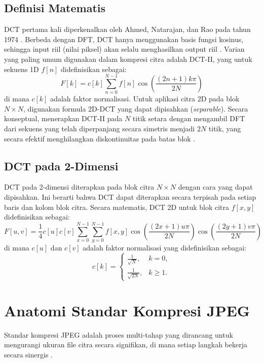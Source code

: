 \documentclass[a4paper]{article}
\begin{document}
\subsection{Definisi Matematis}
DCT pertama kali diperkenalkan oleh Ahmed, Natarajan, dan Rao pada tahun 1974 \cite{ahmed1974dct}. Berbeda dengan DFT, DCT hanya menggunakan basis fungsi kosinus, sehingga input riil (nilai piksel) akan selalu menghasilkan output riil \cite{ucsd_dct_notes}. Varian yang paling umum digunakan dalam kompresi citra adalah DCT-II, yang untuk sekuens 1D $f[n]$ didefinisikan sebagai:
\begin{equation} \label{eq:dct_1d}
  F[k] = c[k] \sum_{n=0}^{N-1} f[n] \cos\left(\frac{(2n+1)k\pi}{2N}\right)
\end{equation}
di mana $c[k]$ adalah faktor normalisasi. Untuk aplikasi citra 2D pada blok $N \times N$, digunakan formula 2D-DCT yang dapat dipisahkan (\textit{separable}). Secara konseptual, menerapkan DCT-II pada $N$ titik setara dengan mengambil DFT dari sekuens yang telah diperpanjang secara simetris menjadi $2N$ titik, yang secara efektif menghilangkan diskontinuitas pada batas blok \cite{ucsd_dct_notes}.

\subsection{DCT pada 2-Dimensi}
DCT pada 2-dimensi diterapkan pada blok citra $N \times N$ dengan cara yang dapat dipisahkan. Ini berarti bahwa DCT dapat diterapkan secara terpisah pada setiap baris dan kolom blok citra. Secara matematis, DCT 2D untuk blok citra $f[x,y]$ didefinisikan sebagai:
\begin{equation} \label{eq:dct_2d}
  F[u,v] = \frac{1}{4} c[u] c[v] \sum_{x=0}^{N-1} \sum_{y=0}^{N-1} f[x,y] \cos\left(\frac{(2x+1)u\pi}{2N}\right) \cos\left(\frac{(2y+1)v\pi}{2N}\right)
\end{equation}
di mana $c[u]$ dan $c[v]$ adalah faktor normalisasi yang didefinisikan sebagai:
\begin{equation}
  c[k] =
  \begin{cases}
    \frac{1}{\sqrt{N}},  & k = 0,   \\[4pt]
    \frac{1}{\sqrt{2N}}, & k \ge 1.
  \end{cases}
\end{equation}

\section{Anatomi Standar Kompresi JPEG}
Standar kompresi JPEG adalah proses multi-tahap yang dirancang untuk mengurangi ukuran file citra secara signifikan, di mana setiap langkah bekerja secara sinergis \cite{wallace1991jpeg}.
\end{document}
